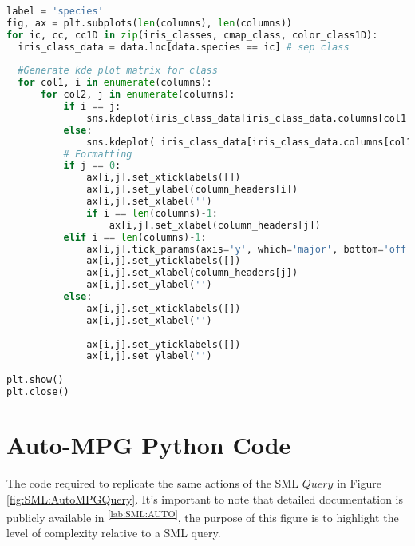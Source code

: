\begin{lstlisting}[language=python]
label = 'species'
fig, ax = plt.subplots(len(columns), len(columns))
for ic, cc, cc1D in zip(iris_classes, cmap_class, color_class1D): 
  iris_class_data = data.loc[data.species == ic] # sep class
   
  #Generate kde plot matrix for class
  for col1, i in enumerate(columns):
      for col2, j in enumerate(columns):
          if i == j:
              sns.kdeplot(iris_class_data[iris_class_data.columns[col1]], ax=ax[col1][col2], color=cc1D, shade=True, legend=False)
          else:
              sns.kdeplot( iris_class_data[iris_class_data.columns[col1]], iris_class_data[iris_class_data.columns[col2]], ax=ax[col1][col2], cmap=cc)    
          # Formatting
          if j == 0:
              ax[i,j].set_xticklabels([])
              ax[i,j].set_ylabel(column_headers[i])
              ax[i,j].set_xlabel('')
              if i == len(columns)-1:
                  ax[i,j].set_xlabel(column_headers[j])
          elif i == len(columns)-1:
              ax[i,j].tick_params(axis='y', which='major', bottom='off')
              ax[i,j].set_yticklabels([])
              ax[i,j].set_xlabel(column_headers[j])
              ax[i,j].set_ylabel('')                
          else:
              ax[i,j].set_xticklabels([])
              ax[i,j].set_xlabel('')
              
              ax[i,j].set_yticklabels([])
              ax[i,j].set_ylabel('')
  
plt.show()
plt.close()
\end{lstlisting}

\clearpage

\section{Auto-MPG Python Code} \label{Appendix:Auto}
The code required to replicate the same actions of the SML \(Query\) in Figure \ref{fig:SML:AutoMPGQuery}. It's important to note that detailed documentation is publicly available in \textsuperscript{\ref{lab:SML:AUTO}}, the purpose of this figure is to highlight the level of complexity relative to a SML query.

